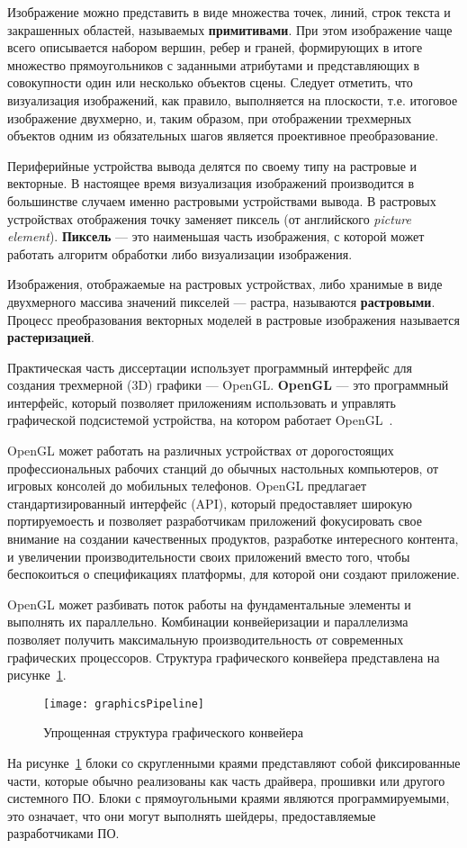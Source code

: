 Изображение можно представить в виде множества точек, линий, строк текста и
закрашенных областей, называемых \textbf{примитивами}. При этом изображение чаще
всего описывается набором вершин, ребер и граней, формирующих в итоге множество
прямоугольников с заданными атрибутами и представляющих в совокупности один или
несколько объектов сцены. Следует отметить, что визуализация изображений, как
правило, выполняется на плоскости, т\@.е\@. итоговое изображение двухмерно, и,
таким образом, при отображении трехмерных объектов одним из обязательных шагов
является проективное преобразование.

Периферийные устройства вывода делятся по своему типу на растровые и векторные.
В настоящее время визуализация изображений производится в большинстве случаем
именно растровыми устройствами вывода. В растровых устройствах отображения точку
заменяет пиксель (от английского \textit{picture element}). \textbf{Пиксель} ---
это наименьшая часть изображения, с которой может работать алгоритм обработки
либо визуализации изображения.

Изображения, отображаемые на растровых устройствах, либо хранимые в виде
двухмерного массива значений пикселей --- растра, называются
\textbf{растровыми}. Процесс преобразования векторных моделей в растровые
изображения называется \textbf{растеризацией}.

Практическая часть диссертации использует программный интерфейс \break{}для
создания трехмерной (3D) графики --- OpenGL\@. \textbf{OpenGL} --- это
программный интерфейс, который позволяет приложениям использовать и управлять
графической подсистемой устройства, на котором работает
OpenGL~\cite{OGLSuperbible}.

OpenGL может работать на различных устройствах от дорогостоящих профессиональных
рабочих станций до обычных настольных компьютеров, от игровых консолей до
мобильных телефонов. OpenGL предлагает стандартизированный интерфейс (API),
который предоставляет широкую портируемоесть и позволяет разработчикам
приложений фокусировать свое внимание на создании качественных продуктов,
разработке интересного контента, и увеличении производительности своих
приложений вместо того, чтобы беспокоиться о спецификациях платформы, для
которой они создают приложение.

OpenGL может разбивать поток работы на фундаментальные элементы и выполнять их
параллельно. Комбинации конвейеризации и параллелизма позволяет получить
максимальную производительность от современных графических процессоров.
Структура графического конвейера представлена на
рисунке~\ref{fig:graphicsPipeline}.
\begin{figure}[htb]
	\centering
	\texttt{[image: graphicsPipeline]}
	\caption{Упрощенная структура графического конвейера}%
    \label{fig:graphicsPipeline}
\end{figure}
На рисунке~\ref{fig:graphicsPipeline} блоки со скругленными краями представляют
собой фиксированные части, которые обычно реализованы как часть драйвера,
прошивки или другого системного ПО. Блоки с прямоугольными краями являются
программируемыми, это означает, что они могут выполнять шейдеры, предоставляемые
разработчиками ПО.

